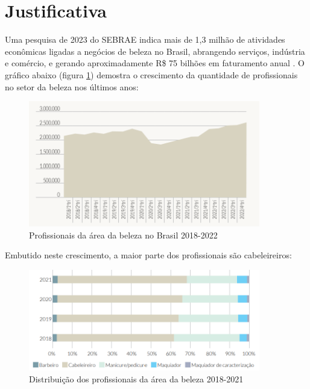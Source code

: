 \section{Justificativa}

Uma pesquisa de 2023 do SEBRAE indica mais de 1,3 milhão de atividades econômicas ligadas a negócios de beleza no Brasil, abrangendo serviços, indústria e comércio, e gerando aproximadamente R\$ 75 bilhões em faturamento anual \cite{sebrae2023forca}. O gráfico abaixo (figura \ref{fig:profissionais_brasil}) demostra o crescimento da quantidade de profissionais no setor da beleza nos últimos anos:

 \begin{figure}[htb]
 	\centering
 	\includegraphics[width=0.9\textwidth]{cap01-Introducao/Images/1.3_grafico_profissionais_brasil}
 	\caption{Profissionais da área da beleza no Brasil 2018-2022}
 	\label{fig:profissionais_brasil}
 \end{figure}
 
Embutido neste crescimento, a maior parte dos profissionais são cabeleireiros: 

\begin{figure}[htb]
	\centering
	\includegraphics[width=0.9\textwidth]{cap01-Introducao/Images/1.3_grafico_maioria_cabeleireiros}
	\caption{Distribuição dos profissionais da área da beleza 2018-2021}
	\label{fig:Distribuição_profissionais}
\end{figure}

